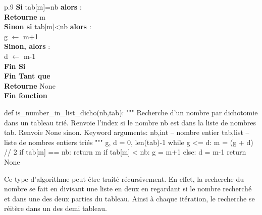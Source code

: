 \documentclass[10pt,fleqn]{article} %
\newcommand{\bfsf}[1]{\small\textbf{\textsf{#1}}}%
\newcommand{\tsf}[1]{\small{\textsf{#1}}}
\begin{document}
\begin{exemple}
\begin{minipage}[c]{.48\linewidth}
\begin{center}
\begin{tabular}{p{.9\textwidth}}
\hspace{1.2cm}\bfsf{Si} \tsf{tab[m]=nb} \bfsf{alors} :\\
\hspace{1.6cm}\bfsf{Retourne} \tsf{m}\\
\hspace{1.2cm}\bfsf{Sinon si} \tsf{tab[m]<nb} \bfsf{alors} :\\
\hspace{1.6cm}\tsf{g} $\leftarrow$ \tsf{m+1}\\
\hspace{1.2cm}\bfsf{Sinon, alors} :\\
\hspace{1.6cm}\tsf{d} $\leftarrow$ \tsf{m-1}\\
\hspace{.8cm} \bfsf{Fin Si} \\
\hspace{.4cm}\bfsf{Fin Tant que} \\
\hspace{.4cm}\bfsf{Retourne} \tsf{None} \\
\bfsf{Fin fonction} \\
\hline
\end{tabular}
\end{center}
\end{minipage} \hfill
\begin{minipage}[c]{.48\linewidth}
\begin{python}
def is_number_in_list_dicho(nb,tab):
    """ 
    Recherche d'un nombre par dichotomie dans un 
    tableau trié. 
    Renvoie l'index si le nombre nb est dans la liste 
    de nombres tab.
    Renvoie None sinon.
    Keyword arguments:
    nb,int -- nombre entier
    tab,list -- liste de nombres entiers triés
    """
    g, d = 0, len(tab)-1
    while g <= d:
        m = (g + d) // 2
        if tab[m] == nb:
            return m
        if tab[m] < nb:
            g = m+1
        else:
            d = m-1
    return None
\end{python}
\end{minipage}
\end{exemple}

Ce type d'algorithme peut être traité récursivement. En effet, la recherche du nombre se fait en divisant une liste en deux en regardant si le nombre recherché et dans une des deux parties du tableau. Ainsi à chaque itération, le recherche se réitère dans un des demi tableau.
\end{document}
